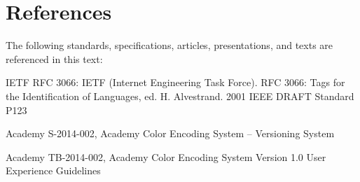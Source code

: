 \numberedformat
\chapter{References}
The following standards, specifications, articles, presentations, and texts are referenced in this text:

IETF RFC 3066:  IETF (Internet Engineering Task Force). RFC 3066: Tags for the Identification of Languages, ed. H. Alvestrand. 2001 IEEE DRAFT Standard P123

Academy S-2014-002, Academy Color Encoding System -- Versioning System

Academy TB-2014-002, Academy Color Encoding System Version 1.0 User Experience Guidelines